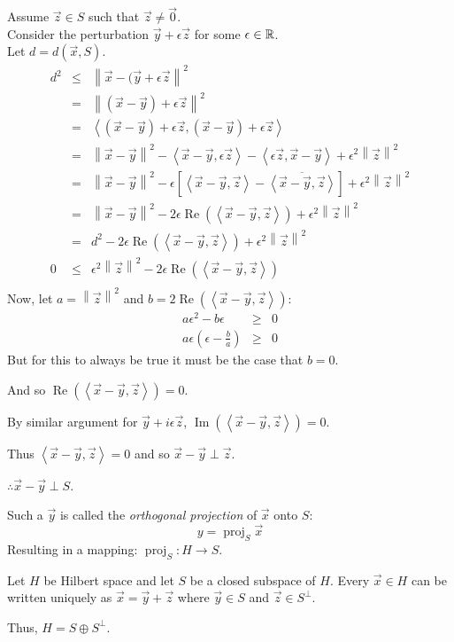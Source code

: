 \documentclass[letterpaper,12pt,fleqn]{article}
\newcommand{\vx}{\vec{x}}
\newcommand{\vy}{\vec{y}}
\newcommand{\vz}{\vec{z}}
\newcommand{\vo}{\vec{0}}
\newcommand{\Sp}{S^{\perp}}
\newcommand{\e}{\epsilon}
\newcommand{\norm}[1]{\left\|#1\right\|}
\newcommand{\inner}[1]{\left<#1\right>}
\newcommand{\conj}[1]{\overline{#1}}
\DeclareMathOperator{\Real}{Re}
\DeclareMathOperator{\Imag}{Im}
\DeclareMathOperator{\proj}{proj}
\begin{document}
\begin{theproof}
  Assume $\vz\in S$ such that $\vz\ne\vo$. \\
  Consider the perturbation $\vy+\e\vz$ for some $\e\in\R$. \\
  Let $d=d(\vx,S)$.
  \begin{eqnarray*}
    d^2 &\le& \norm{\vx-(\vy+\e\vz}^2 \\
    &=& \norm{(\vx-\vy)+\e\vz}^2 \\
    &=& \inner{(\vx-\vy)+\e\vz,(\vx-\vy)+\e\vz} \\
    &=& \norm{\vx-\vy}^2-\inner{\vx-\vy,\e\vz}-\inner{\e\vz,\vx-\vy}+
    \e^2\norm{\vz}^2 \\
    &=& \norm{\vx-\vy}^2-\e[\inner{\vx-\vy,\vz}-\conj{\inner{\vx-\vy,\vz}}]+
    \e^2\norm{\vz}^2 \\
    &=& \norm{\vx-\vy}^2-2\e\Real(\inner{\vx-\vy,\vz})+\e^2\norm{\vz}^2 \\
    &=& d^2-2\e\Real(\inner{\vx-\vy,\vz})+\e^2\norm{\vz}^2 \\
    0 &\le& \e^2\norm{\vz}^2-2\e\Real(\inner{\vx-\vy,\vz}) \\
  \end{eqnarray*}
  Now, let $a=\norm{\vz}^2$ and $b=2\Real(\inner{\vx-\vy,\vz})$:  
  \begin{eqnarray*}
    a\e^2-b\e &\ge& 0 \\
    a\e\left(\e-\frac{b}{a}\right) &\ge& 0
  \end{eqnarray*}
  But for this to always be true it must be the case that $b=0$.

  And so $\Real(\inner{\vx-\vy,\vz})=0$.

  By similar argument for $\vy+i\e\vz$, $\Imag(\inner{\vx-\vy,\vz})=0$.

  Thus $\inner{\vx-\vy,\vz}=0$ and so $\vx-\vy\perp\vz$.

  $\therefore\vx-\vy\perp S$.
\end{theproof}

Such a $\vy$ is called the \emph{orthogonal projection} of $\vx$ onto $S$:
\[y=\proj_S\vx\]
Resulting in a mapping: $\proj_S:H\to S$.

\begin{corollary}
  Let $H$ be Hilbert space and let $S$ be a closed subspace of $H$. Every
  $\vx\in H$ can be written uniquely as $\vx=\vy+\vz$ where $\vy\in S$ and
  $\vz\in\Sp$.

  Thus, $H=S\oplus\Sp$.
\end{corollary}
\end{document}
